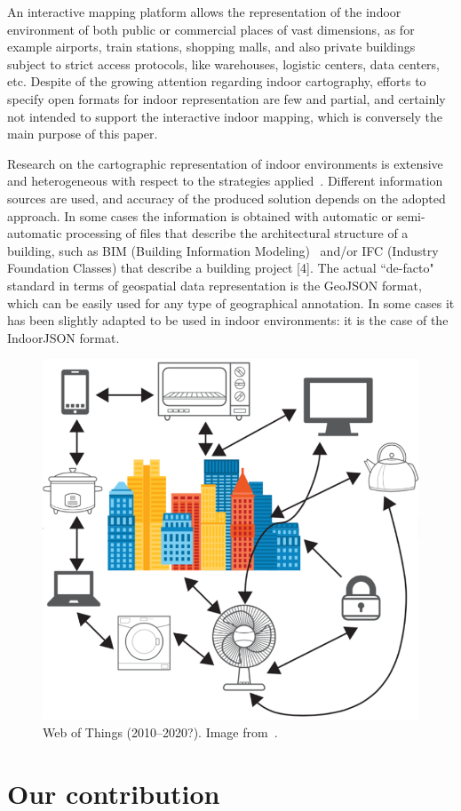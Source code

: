 \documentclass{sig-alternate}
\begin{document}
An interactive mapping platform allows the representation of the indoor environment of  both public or commercial places of vast dimensions, as for example airports, train stations, shopping malls, and also private buildings subject to strict access protocols, like warehouses, logistic centers, data centers, etc.
Despite of the growing attention regarding indoor cartography, efforts to specify open formats for indoor representation are few and partial, and certainly not intended to support the interactive indoor mapping, which is conversely the main purpose of this paper.

Research on the cartographic representation of indoor environments is extensive and heterogeneous with respect to the strategies applied~\cite{6418876}. Different information sources are used, and accuracy of the produced solution depends on the adopted approach. In some cases the information is obtained with automatic or semi-automatic processing of files that describe the architectural structure of a building, such as BIM (Building Information Modeling)~\cite{Eastman:2008:BHG:1796500} and/or IFC (Industry Foundation Classes) that describe a building project [4]. 
The actual ``de-facto" standard in terms of geospatial data representation is the GeoJSON format, which can be easily used for any type of geographical annotation. In some cases it has been slightly adapted to be used in indoor environments: it is the case of the IndoorJSON format.

\begin{figure}[htbp]
\centering
\includegraphics[width=.6\linewidth]{../images/webOfThings}
\caption{Web of Things (2010--2020?).  Image from~\cite{webOfThings:2015}.}
\label{fig:pipeline}
\end{figure}


\section{Our contribution}
\end{document}
